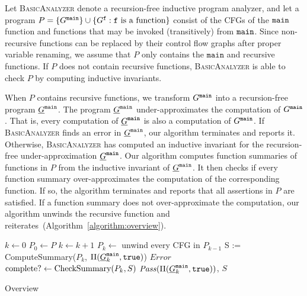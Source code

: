 
Let \textsc{BasicAnalyzer} denote a recursion-free inductive program analyzer, and let a program $P=\{G^{\mathtt{{main}}}\}\cup\{G^{\mathtt{{f}}} : \mathtt{{f}}\mbox{ is a function}\}$ consist of the CFGs of the $\mathtt{{main}}$ function and functions that may be invoked (transitively) from $\mathtt{{main}}$.
Since non-recursive functions can be replaced by their control flow graphs
after proper variable renaming, we assume that $P$ only contains the
$\mathtt{main}$ and recursive functions. If $P$ does not contain
recursive functions, \textsc{BasicAnalyzer} is able to check $P$ by
computing inductive invariants.


When $P$ contains recursive functions, we transform $G^{\mathtt{{main}}}$ into a
recursion-free program $\underline{G}^{\mathtt{{main}}}$. The program $\underline{G}^{\mathtt{{main}}}$
under-approximates the computation of $G^{\mathtt{{main}}}$. That is, every computation
of $\underline{G}^{\mathtt{{main}}}$ is also a computation of $G^{\mathtt{{main}}}$. If
\textsc{BasicAnalyzer} finds an error in $\underline{G}^{\mathtt{{main}}}$, our
algorithm terminates and reports it. Otherwise,
\textsc{BasicAnalyzer} has computed an inductive invariant for the
recursion-free under-approximation $\underline{G}^{\mathtt{{main}}}$. Our algorithm
computes function summaries of functions in $P$ from the inductive invariant of
$\underline{G}^{\mathtt{{main}}}$. It then checks if every function summary
over-approximates the computation of the corresponding function. If
so, the algorithm terminates and reports that all assertions in $P$
are satisfied. If a function summary does not over-approximate the
computation, our algorithm unwinds the recursive function and
reiterates~(Algorithm~\ref{algorithm:overview}).

\begin{algorithm}[htb]

  $k \leftarrow 0$\;
  $P_0 \leftarrow P$\;
  {
    $k \leftarrow k + 1$\;
    $P_{k} \leftarrow $ unwind every CFG in $P_{k-1}$\;
    {
      {    
        S := ComputeSummary($P_k$, $\Pi (\underline{G}^{\mathtt{{main}}}_k, \mathtt{true})$)\;
      }
      {
        \Return $\mathit{Error}$\;
      }
    }
    $\textmd{complete?} \leftarrow \textmd{CheckSummary} (P_k, S)$\;
  }
  \Return $\mathit{Pass} (\Pi (\underline{G}^{\mathtt{{main}}}_k, \mathtt{true}))$, $S$\;
  \caption{Overview}
  \label{algorithm:overview}
\end{algorithm} 
\vspace{-0.5cm}

